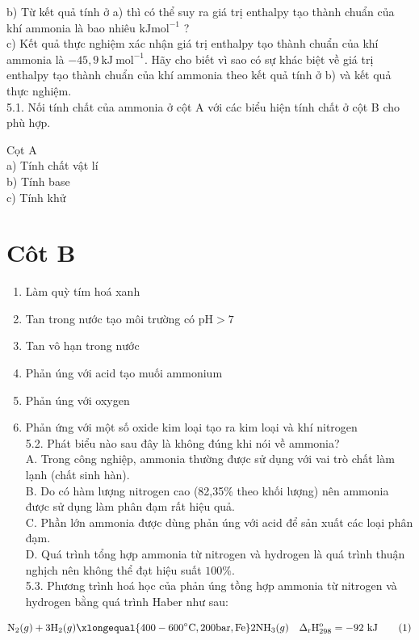\documentclass[10pt]{article}
\begin{document}
b) Từ kết quả tính ở a) thì có thể suy ra giá trị enthalpy tạo thành chuẩn của khí ammonia là bao nhiêu $\mathrm{kJ} \mathrm{mol}^{-1}$ ?\\
c) Kết quả thực nghiệm xác nhận giá trị enthalpy tạo thành chuẩn của khí ammonia là $-45,9 \mathrm{~kJ} \mathrm{~mol}^{-1}$. Hãy cho biết vì sao có sự khác biệt về giá trị enthalpy tạo thành chuẩn của khí ammonia theo kết quả tính ở b) và kết quả thực nghiệm.\\
5.1. Nối tính chất của ammonia ở cột A với các biểu hiện tính chất ở cột B cho phù hợp.

Cọt A\\
a) Tính chất vật lí\\
b) Tính base\\
c) Tính khử

\section*{Côt B}
\begin{enumerate}
  \item Làm quỳ tím hoá xanh
  \item Tan trong nước tạo môi trường có $\mathrm{pH}>7$
  \item Tan vô hạn trong nước
  \item Phản úng với acid tạo muối ammonium
  \item Phản úng với oxygen
  \item Phản ứng với một số oxide kim loại tạo ra kim loại và khí nitrogen\\
5.2. Phát biểu nào sau đây là không đúng khi nói về ammonia?\\
A. Trong công nghiệp, ammonia thường được sử dụng với vai trò chất làm lạnh (chất sinh hàn).\\
B. Do có hàm lượng nitrogen cao (82,35\% theo khối lượng) nên ammonia được sử dụng làm phân đạm rất hiệu quả.\\
C. Phần lớn ammonia được dùng phản úng với acid để sản xuất các loại phân đạm.\\
D. Quá trình tổng hợp ammonia từ nitrogen và hydrogen là quá trình thuận nghịch nên không thể đạt hiệu suất $100 \%$.\\
5.3. Phương trình hoá học của phản úng tồng hợp ammonia từ nitrogen và hydrogen bằng quá trình Haber như sau:
\end{enumerate}


\begin{equation*}
\mathrm{N}_{2}(g)+3 \mathrm{H}_{2}(g) \xlongequal{400-600^{\circ} \mathrm{C}, 200 \mathrm{bar}, \mathrm{Fe}} 2 \mathrm{NH}_{3}(g) \quad \Delta_{\mathrm{r}} \mathrm{H}_{298}^{\mathrm{o}}=-92 \mathrm{~kJ} \tag{1}
\end{equation*}
\end{document}
